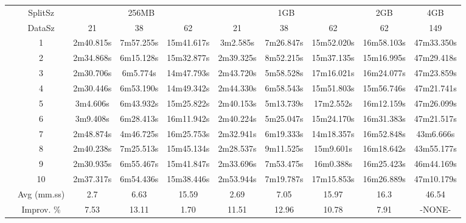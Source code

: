 \begin{tabularx}{\linewidth}{*{10}{c|}}
\cline{2-10}
& SplitSz 
& \multicolumn{3}{c|}{256MB} & \multicolumn{3}{c|}{1GB}  & \multicolumn{1}{c|}{2GB} & \multicolumn{1}{c|}{4GB} \\
\cline{2-10}
& DataSz 
& 21 & 38 & 62 & 21 & 38 & 62 & 62 & 149 \\
\cline{2-10}
& 1
& 2m40.815s & 7m57.255s & 15m41.617s & 3m2.585s & 7m26.847s & 15m52.020s & 16m58.103s & 47m33.350s \\
\cline{2-10}
& 2
& 2m34.868s & 6m15.128s & 15m32.877s & 2m39.325s & 8m52.215s & 15m37.135s & 15m16.995s & 47m29.418s \\
\cline{2-10}
& 3
& 2m30.706s & 6m5.774s & 14m47.793s & 2m43.720s & 5m58.528s & 17m16.021s & 16m24.077s & 47m23.859s \\
\cline{2-10}
& 4
& 2m30.446s & 6m53.190s & 14m49.342s & 2m44.330s & 6m58.543s & 15m51.803s & 15m56.746s & 47m21.741s \\
\cline{2-10}
& 5
& 3m4.606s & 6m43.932s & 15m25.822s & 2m40.153s & 5m13.739s & 17m2.552s & 16m12.159s & 47m26.099s \\
\cline{2-10}
& 6
& 3m9.408s & 6m28.413s & 16m11.942s & 2m40.224s & 5m25.047s & 15m24.170s & 16m31.383s & 47m21.517s \\
\cline{2-10}
& 7
& 2m48.874s & 4m46.725s & 16m25.753s & 2m32.941s & 6m19.333s & 14m18.357s & 16m52.848s & 43m6.666s \\
\cline{2-10}
& 8
& 2m40.238s & 7m25.513s & 15m45.134s & 2m28.537s & 9m11.525s & 15m9.601s & 16m18.642s & 43m55.177s \\
\cline{2-10}
& 9
& 2m30.935s & 6m55.467s & 15m41.847s & 2m33.696s & 7m53.475s & 16m0.388s & 16m25.423s & 46m44.169s \\
\cline{2-10}
& 10
& 2m37.317s & 6m54.436s & 15m38.446s & 2m53.944s & 7m19.787s & 17m15.853s & 16m26.889s & 47m10.179s \\
\cline{2-10}
& Avg (mm.ss)
& 2.7 & 6.63 & 15.59 & 2.69 & 7.05 & 15.97 & 16.3 & 46.54 \\
\cline{2-10}
& Improv. \%
& 7.53 & 13.11 & 1.70 & 11.51 & 12.96 & 10.78 & 7.91 & -NONE- \\
\cline{2-10}
\end{tabularx}
